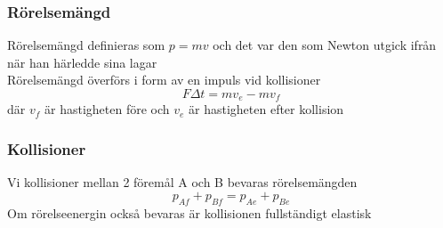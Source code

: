 \documentclass[11pt]{beamer}
\begin{document}
    \begin{frame}
        \frametitle{Rörelsemängd}
        Rörelsemängd definieras som $ p = m v$ och det var den som Newton utgick ifrån när han härledde sina lagar\\
        Rörelsemängd överförs i form av en impuls vid kollisioner
        \begin{equation}
            F \Delta t = mv_e - m v_f
        \end{equation}
        där $v_f$ är hastigheten före och $v_e$ är hastigheten efter kollision
    \end{frame}
    \begin{frame}
        \frametitle{Kollisioner}
        Vi kollisioner mellan 2 föremål A och B bevaras rörelsemängden
        \begin{equation}
            p_{Af} + p_{Bf} = p_{Ae} + p_{Be}
        \end{equation}
        Om rörelseenergin också bevaras är kollisionen fullständigt elastisk

    \end{frame}
\end{document}
